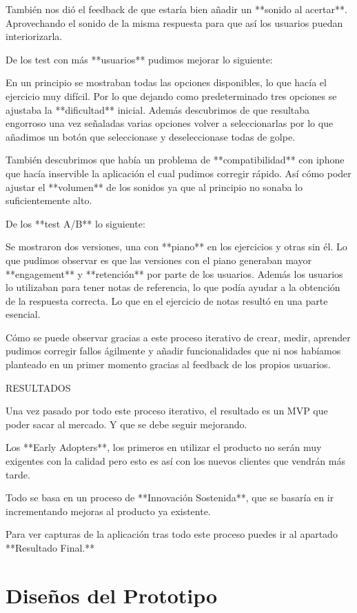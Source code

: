 \documentclass[12pt,twoside,titlepage]{report}
\begin{document}
También nos dió el feedback de que estaría bien añadir un **sonido al acertar**. Aprovechando el sonido de la misma respuesta para que así los usuarios puedan interiorizarla.

De los test con más **usuarios** pudimos mejorar lo siguiente:

En un principio se mostraban todas las opciones disponibles, lo que hacía el ejercicio muy difícil. Por lo que dejando como predeterminado tres opciones se ajustaba la **dificultad** inicial. Además descubrimos de que resultaba engorroso una vez señaladas varias opciones volver a seleccionarlas por lo que añadimos un botón que seleccionase y deseleccionase todas de golpe.

También descubrimos que había un problema de **compatibilidad** con iphone que hacía inservible la aplicación el cual pudimos corregir rápido. Así cómo poder ajustar el **volumen** de los sonidos ya que al principio no sonaba lo suficientemente alto.

De los **test A/B** lo siguiente:

Se mostraron dos versiones, una con **piano** en los ejercicios y otras sin él. Lo que pudimos observar es que las versiones con el piano generaban mayor **engagement** y **retención** por parte de los usuarios. Además los usuarios lo utilizaban para tener notas de referencia, lo que podía ayudar a la obtención de la respuesta correcta. Lo que en el ejercicio de notas resultó en una parte esencial.

Cómo se puede observar gracias a este proceso iterativo de crear, medir, aprender pudimos corregir fallos ágilmente y añadir funcionalidades que ni nos habíamos planteado en un primer momento gracias al feedback de los propios usuarios.

RESULTADOS

Una vez pasado por todo este proceso iterativo, el resultado es un MVP que poder sacar al mercado. Y que se debe seguir mejorando. 

Los **Early Adopters**, los primeros en utilizar el producto no serán muy exigentes con la calidad pero esto es así con los nuevos clientes que vendrán más tarde. 

Todo se basa en un proceso de **Innovación Sostenida**, que se basaría en ir incrementando mejoras al producto ya existente.

Para ver capturas de la aplicación tras todo este proceso puedes ir al apartado **Resultado Final.**

\chapter{Diseños del Prototipo}
\end{document}
